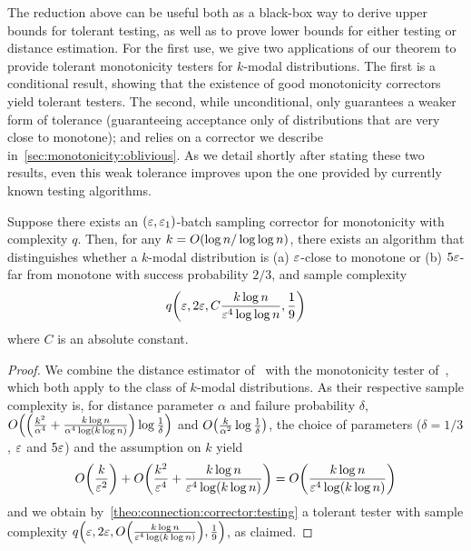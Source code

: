 The reduction above can be useful both as a black-box 
way to derive upper bounds for tolerant testing, 
as well as to prove lower bounds for either testing or distance estimation. 
For the first use, we give two applications of 
our theorem to provide tolerant monotonicity testers for $k$-modal distributions. 
The first is a conditional result, 
showing that the existence of
good monotonicity correctors yield tolerant testers. The second, 
while unconditional, only guarantees a weaker form of tolerance
(guaranteeing acceptance only of distributions that are very close to monotone); 
and relies on a corrector we describe in~\cref{sec:monotonicity:oblivious}. 
As we detail shortly after stating these two results, 
even this weak tolerance improves upon the one provided by currently 
known testing algorithms.


\begin{corollary}\label{coro:connection:corrector:testing}
Suppose there exists an $(\varepsilon,\varepsilon_1)$-batch sampling corrector for monotonicity with complexity $q$. Then, for any $k=\bigO{\log n/\log\log n}$, there exists an algorithm that distinguishes whether a $k$-modal distribution is  \textsf{(a)} $\varepsilon$-close to monotone or  \textsf{(b)} $5\varepsilon$-far from monotone with success probability $2/3$, and sample complexity
\[
	q\!\left( \varepsilon, 2\varepsilon, C\frac{k\log n}{\varepsilon^4\log\log n}, \frac{1}{9}  \right)
\]
where $C$ is an absolute constant.
\end{corollary}
\begin{proof}
 We combine the distance estimator of~\cite{DDSVV:13} with the monotonicity tester of~\cite[Section 3.4]{DDS:12}, which both apply to  the class of $k$-modal distributions. As their respective sample complexity is, for distance parameter $\alpha$ and failure probability $\delta$, $\bigO{\left(\frac{k^2}{\alpha^4}+\frac{k\log n}{\alpha^4\log(k\log n)}\right)\log\frac{1}{\delta}}$ and $\bigO{\frac{k}{\alpha^2}\log\frac{1}{\delta}}$, the choice of parameters ($\delta=1/3$, $\varepsilon$ and $5\varepsilon$) and the assumption on $k$ yield
 \[
   \bigO{\frac{k}{\eps^2}} + \bigO{\frac{k^2}{\eps^4}+\frac{k\log n}{\eps^4\log(k\log n)} }
   = \bigO{\frac{k\log n}{\eps^4\log(k\log n)}}
 \]
  and we obtain by~\cref{theo:connection:corrector:testing} a tolerant tester with sample complexity $q\!\left( \eps, 2\eps, \bigO{\frac{k\log n}{\eps^4\log(k\log n)}}, \frac{1}{9}  \right)$, as claimed.
\end{proof}

